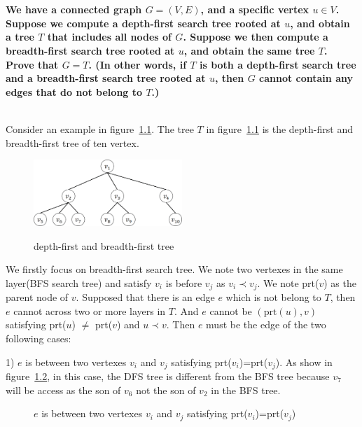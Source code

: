 
\chapter{}
\textbf{
We have a connected graph $G=(V,E)$, and a specific vertex $u\in V$. Suppose we compute a depth-first search tree rooted at $u$, and obtain a tree $T$ that includes all nodes of $G$. Suppose we then compute a breadth-first search tree rooted at $u$, and obtain the same tree $T$. Prove that $G=T$. (In other words, if $T$ is both a depth-first search tree and a breadth-first search tree rooted at $u$, then $G$ cannot contain any edges that do not belong to $T$.)
}


\hspace*{\fill} \\

Consider an example in figure~\ref{figure_0}. The tree $T$ in figure~\ref{figure_0} is the depth-first and breadth-first tree of ten vertex. 
\begin{figure}[!htbp]
  \centering
  \includegraphics[width=0.5\textwidth]{figures/0.eps}\\
  \caption{depth-first and breadth-first tree}\label{figure_0}
\end{figure}
We firstly focus on breadth-first search tree.
We note two vertexes in the same layer(BFS search tree) and satisfy $v_i$ is before $v_j$ as $v_i \prec v_j$. We note prt($v$) as the parent node of $v$. Supposed that there is an edge $e$ which is not belong to $T$, then $e$ cannot across two or more layers in $T$. And $e$ cannot be $(\textrm{prt}(u),v)$ satisfying prt($u$) $\neq$ prt($v$) and $u\prec v$. Then $e$ must be the edge of the two following cases:

1) $e$ is between two vertexes $v_i$ and $v_j$ satisfying prt($v_i$)=prt($v_j$). As show in figure~\ref{figure_1_2}, in this case, the DFS tree is different from the BFS tree because $v_7$ will be access as the son of $v_6$ not the son of $v_2$ in the BFS tree.
\begin{figure}[!htbp]
\centering
{}
\caption{$e$ is between two vertexes $v_i$ and $v_j$ satisfying prt($v_i$)=prt($v_j$)}\label{figure_1_2}
\end{figure}

